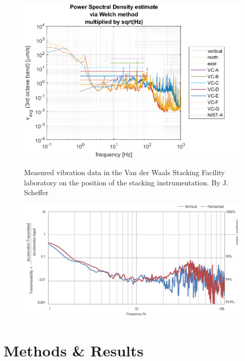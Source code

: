 \documentclass[11pt]{article}
\begin{document}
\begin{figure}[H]
  \centering
  \begin{minipage}[b]{0.49\textwidth}
    \includegraphics[width=\textwidth]{img/resonance/geophone_measurement_position_1.png}
    \caption{Measured vibration data in the Van der Waals Stacking Facility laboratory on the position of the stacking instrumentation. By J. Scheffer}
    \label{fig:GEOPhone_measurement}
  \end{minipage}
  \hfill
  \begin{minipage}[b]{0.49\textwidth}
    \includegraphics[width=\textwidth]{img/resonance/damping_table_response.png}
    \caption{}
    \label{fig:damp_table_response}
  \end{minipage}
\end{figure}


\section{Methods \& Results}
\end{document}
